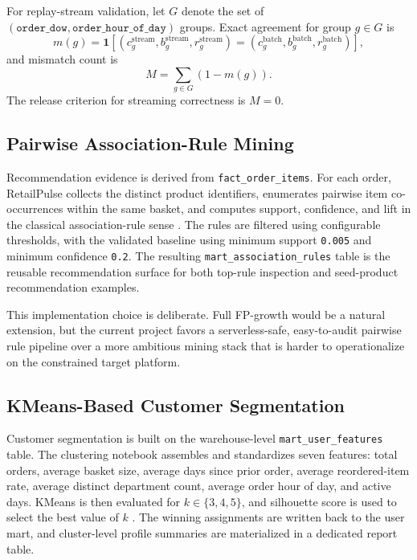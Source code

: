 \documentclass[journal]{IEEEtran}
\begin{document}
For replay-stream validation, let \(G\) denote the set of \((\texttt{order\_dow},\texttt{order\_hour\_of\_day})\) groups. Exact agreement for group \(g \in G\) is
\begin{equation}
m(g)=\mathbf{1}\!\left[(c_g^\mathrm{stream}, b_g^\mathrm{stream}, r_g^\mathrm{stream})=(c_g^\mathrm{batch}, b_g^\mathrm{batch}, r_g^\mathrm{batch})\right],
\end{equation}
and mismatch count is
\begin{equation}
M = \sum_{g \in G} (1-m(g)).
\end{equation}
The release criterion for streaming correctness is \(M=0\).

\subsection{Pairwise Association-Rule Mining}
Recommendation evidence is derived from \texttt{fact\_order\_items}. For each order, RetailPulse collects the distinct product identifiers, enumerates pairwise item co-occurrences within the same basket, and computes support, confidence, and lift in the classical association-rule sense \cite{agrawal1994association}. The rules are filtered using configurable thresholds, with the validated baseline using minimum support \texttt{0.005} and minimum confidence \texttt{0.2}. The resulting \texttt{mart\_association\_rules} table is the reusable recommendation surface for both top-rule inspection and seed-product recommendation examples.

This implementation choice is deliberate. Full FP-growth would be a natural extension, but the current project favors a serverless-safe, easy-to-audit pairwise rule pipeline over a more ambitious mining stack that is harder to operationalize on the constrained target platform.

\subsection{KMeans-Based Customer Segmentation}
Customer segmentation is built on the warehouse-level \texttt{mart\_user\_features} table. The clustering notebook assembles and standardizes seven features: total orders, average basket size, average days since prior order, average reordered-item rate, average distinct department count, average order hour of day, and active days. KMeans is then evaluated for \(k \in \{3,4,5\}\), and silhouette score is used to select the best value of \(k\) \cite{macqueen1967kmeans}. The winning assignments are written back to the user mart, and cluster-level profile summaries are materialized in a dedicated report table.
\end{document}
